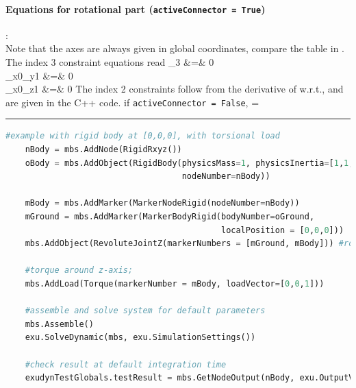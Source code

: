     \paragraph{Equations for rotational part (\texttt{activeConnector = True})}:\\
    Note that the axes are always given in global coordinates, compare the table in .
    The index 3 constraint equations read
    \bea \label{eq:ObjectJointRevoluteZ:index3}
       \lambda_3 &=& 0 \\
       _{x0}\tp {}_{y1} &=& 0 \\
       _{x0}\tp {}_{z1} &=& 0
    \eea
    The index 2 constraints follow from the derivative of  w.r.t., and are given in the C++ code.
    if \texttt{activeConnector = False}, 
    \be
      \zv = \Null
    \ee
\vspace{6pt}\par\noindent\rule{\textwidth}{0.4pt}
\label{miniExample_ObjectJointRevoluteZ}
\pythonstyle
\begin{lstlisting}[language=Python, firstnumber=1]
    #example with rigid body at [0,0,0], with torsional load
    nBody = mbs.AddNode(RigidRxyz())
    oBody = mbs.AddObject(RigidBody(physicsMass=1, physicsInertia=[1,1,1,0,0,0], 
                                    nodeNumber=nBody))
    
    mBody = mbs.AddMarker(MarkerNodeRigid(nodeNumber=nBody))
    mGround = mbs.AddMarker(MarkerBodyRigid(bodyNumber=oGround, 
                                            localPosition = [0,0,0]))
    mbs.AddObject(RevoluteJointZ(markerNumbers = [mGround, mBody])) #rotation around ground Z-axis

    #torque around z-axis; 
    mbs.AddLoad(Torque(markerNumber = mBody, loadVector=[0,0,1])) 

    #assemble and solve system for default parameters
    mbs.Assemble()
    exu.SolveDynamic(mbs, exu.SimulationSettings())
    
    #check result at default integration time
    exudynTestGlobals.testResult = mbs.GetNodeOutput(nBody, exu.OutputVariableType.Rotation)[2]
\end{lstlisting}


